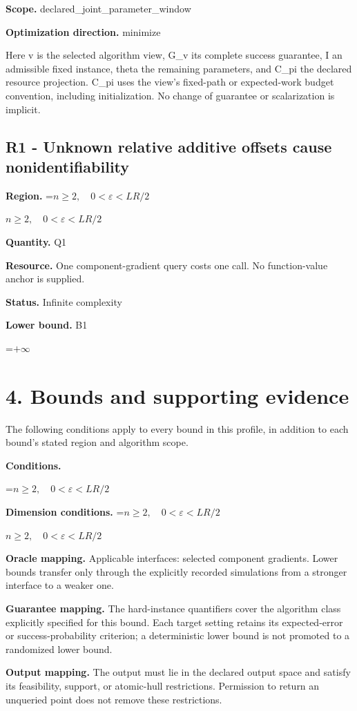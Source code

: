 \documentclass[10pt,a4paper]{article}
\newcommand{\AtlasMath}[1]{\par\begingroup\centering\setbox0=\hbox{$\displaystyle #1$}\ifdim\wd0>1.4\linewidth\typeout{ATLAS WIDE FORMULA: \the\wd0}\fi\ifdim\wd0>\linewidth\resizebox{\linewidth}{!}{\box0}\else\box0\fi\par\endgroup}
\newcommand{\AtlasInlineMath}[1]{\begingroup\setbox0=\hbox{$#1$}\ifdim\wd0>.4\linewidth\endgroup\AtlasMath{#1}\else\endgroup$#1$\fi}
\begin{document}
\textbf{Scope.} declared\_joint\_parameter\_window

\textbf{Optimization direction.} minimize

Here v is the selected algorithm view, G\_v its complete success guarantee, I an admissible fixed instance, theta the remaining parameters, and C\_pi the declared resource projection. C\_pi uses the view's fixed-path or expected-work budget convention, including initialization. No change of guarantee or scalarization is implicit.

\subsection{R1 - Unknown relative additive offsets cause nonidentifiability}
\textbf{Region.} \AtlasInlineMath{n\ge2,\quad0<\varepsilon<LR/2}

\textbf{Quantity.} Q1

\textbf{Resource.} One component-gradient query costs one call. No function-value anchor is supplied.

\textbf{Status.} Infinite complexity

\textbf{Lower bound.} B1

\AtlasMath{+\infty}
\section{4. Bounds and supporting evidence}
The following conditions apply to every bound in this profile, in addition to each bound's stated region and algorithm scope.

\textbf{Conditions.} 
\AtlasMath{n\ge2,\quad0<\varepsilon<LR/2}


\textbf{Dimension conditions.} \AtlasInlineMath{n\ge2,\quad0<\varepsilon<LR/2}

\textbf{Oracle mapping.} Applicable interfaces: selected component gradients. Lower bounds transfer only through the explicitly recorded simulations from a stronger interface to a weaker one.

\textbf{Guarantee mapping.} The hard-instance quantifiers cover the algorithm class explicitly specified for this bound. Each target setting retains its expected-error or success-probability criterion; a deterministic lower bound is not promoted to a randomized lower bound.

\textbf{Output mapping.} The output must lie in the declared output space and satisfy its feasibility, support, or atomic-hull restrictions. Permission to return an unqueried point does not remove these restrictions.
\end{document}
